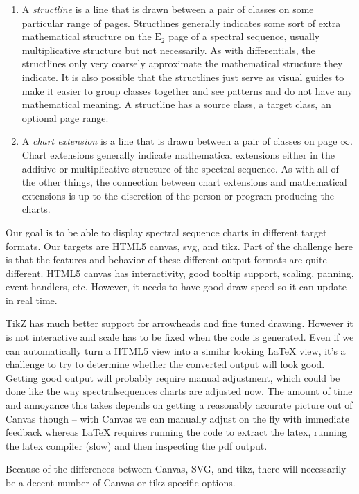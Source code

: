 \documentclass{article}
\newcommand\E{\mathrm{E}}
\begin{document}
\begin{enumerate}
\item
    A \emph{structline} is a line that is drawn between a pair of classes on some particular range of pages.
    Structlines generally indicates some sort of extra mathematical structure on the $\E_2$ page of a spectral sequence, usually multiplicative structure but not necessarily.
    As with differentials, the structlines only very coarsely approximate the mathematical structure they indicate.
    It is also possible that the structlines just serve as visual guides to make it easier to group classes together and see patterns and do not have any mathematical meaning.
    A structline has a source class, a target class, an optional page range.

\item
    A \emph{chart extension} is a line that is drawn between a pair of classes on page $\infty$.
    Chart extensions generally indicate mathematical extensions either in the additive or multiplicative structure of the spectral sequence.
    As with all of the other things, the connection between chart extensions and mathematical extensions is up to the discretion of the person or program producing the charts.
\end{enumerate}

Our goal is to be able to display spectral sequence charts in different target formats.
Our targets are HTML5 canvas, svg, and tikz.
Part of the challenge here is that the features and behavior of these different output formats are quite different. HTML5 canvas has interactivity, good tooltip support, scaling, panning, event handlers, etc. However, it needs to have good draw speed so it can update in real time.

TikZ has much better support for arrowheads and fine tuned drawing.
However it is not interactive and scale has to be fixed when the code is generated.
Even if we can automatically turn a HTML5 view into a similar looking LaTeX view, it's a challenge to try to determine whether the converted output will look good.
Getting good output will probably require manual adjustment, which could be done like the way spectralsequences charts are adjusted now.
The amount of time and annoyance this takes depends on getting a reasonably accurate picture out of Canvas though -- with Canvas we can manually adjust on the fly with immediate feedback whereas LaTeX requires running the code to extract the latex, running the latex compiler (slow) and then inspecting the pdf output.

Because of the differences between Canvas, SVG, and tikz, there will necessarily be a decent number of Canvas or tikz specific options.
\end{document}
